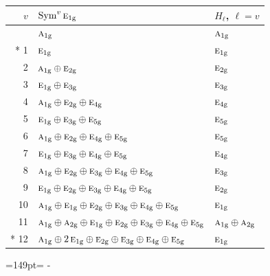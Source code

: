 \documentclass[10pt,a4paper]{article}
\newcommand{\needspace}[1]{\par\penalty-100\begingroup\dimen0=#1\relax\dimen2=\pagegoal
  \advance\dimen2-\pagetotal\ifdim\dimen0>\dimen2\relax\ifdim\dimen2>0pt\vfil\break\fi\fi
  \endgroup}
\numberwithin{equation}{section}
\newcommand{\irr}[1]{\text{\normalfont\scshape #1}}
\newcommand{\ptag}[1]{\mathrm{#1}}
\begin{document}
{\small\begin{longtable}{@{}rll@{}}\toprule
$v$ & $\operatorname{Sym}^{v}\irr{e}_{1\ptag{g}}$ & $H_\ell$, $\ell = v$\\\midrule\endhead
\bottomrule\endfoot\endlastfoot
0 & $\irr{a}_{1\ptag{g}}$ & $\irr{a}_{1\ptag{g}}$\\*
1 & $\irr{e}_{1\ptag{g}}$ & $\irr{e}_{1\ptag{g}}$\\
2 & $\irr{a}_{1\ptag{g}} \oplus \irr{e}_{2\ptag{g}}$ & $\irr{e}_{2\ptag{g}}$\\
3 & $\irr{e}_{1\ptag{g}} \oplus \irr{e}_{3\ptag{g}}$ & $\irr{e}_{3\ptag{g}}$\\
4 & $\irr{a}_{1\ptag{g}} \oplus \irr{e}_{2\ptag{g}} \oplus \irr{e}_{4\ptag{g}}$ & $\irr{e}_{4\ptag{g}}$\\
5 & $\irr{e}_{1\ptag{g}} \oplus \irr{e}_{3\ptag{g}} \oplus \irr{e}_{5\ptag{g}}$ & $\irr{e}_{5\ptag{g}}$\\
6 & $\irr{a}_{1\ptag{g}} \oplus \irr{e}_{2\ptag{g}} \oplus \irr{e}_{4\ptag{g}} \oplus \irr{e}_{5\ptag{g}}$ & $\irr{e}_{5\ptag{g}}$\\
7 & $\irr{e}_{1\ptag{g}} \oplus \irr{e}_{3\ptag{g}} \oplus \irr{e}_{4\ptag{g}} \oplus \irr{e}_{5\ptag{g}}$ & $\irr{e}_{4\ptag{g}}$\\
8 & $\irr{a}_{1\ptag{g}} \oplus \irr{e}_{2\ptag{g}} \oplus \irr{e}_{3\ptag{g}} \oplus \irr{e}_{4\ptag{g}} \oplus \irr{e}_{5\ptag{g}}$ & $\irr{e}_{3\ptag{g}}$\\
9 & $\irr{e}_{1\ptag{g}} \oplus \irr{e}_{2\ptag{g}} \oplus \irr{e}_{3\ptag{g}} \oplus \irr{e}_{4\ptag{g}} \oplus \irr{e}_{5\ptag{g}}$ & $\irr{e}_{2\ptag{g}}$\\
10 & $\irr{a}_{1\ptag{g}} \oplus \irr{e}_{1\ptag{g}} \oplus \irr{e}_{2\ptag{g}} \oplus \irr{e}_{3\ptag{g}} \oplus \irr{e}_{4\ptag{g}} \oplus \irr{e}_{5\ptag{g}}$ & $\irr{e}_{1\ptag{g}}$\\
11 & $\irr{a}_{1\ptag{g}} \oplus \irr{a}_{2\ptag{g}} \oplus \irr{e}_{1\ptag{g}} \oplus \irr{e}_{2\ptag{g}} \oplus \irr{e}_{3\ptag{g}} \oplus \irr{e}_{4\ptag{g}} \oplus \irr{e}_{5\ptag{g}}$ & $\irr{a}_{1\ptag{g}} \oplus \irr{a}_{2\ptag{g}}$\\*
12 & $\irr{a}_{1\ptag{g}} \oplus 2\,\irr{e}_{1\ptag{g}} \oplus \irr{e}_{2\ptag{g}} \oplus \irr{e}_{3\ptag{g}} \oplus \irr{e}_{4\ptag{g}} \oplus \irr{e}_{5\ptag{g}}$ & $\irr{e}_{1\ptag{g}}$\\
\bottomrule\end{longtable}}
\needspace{149pt}
\end{document}
